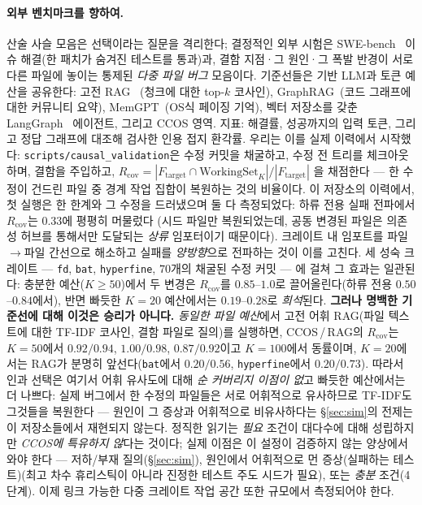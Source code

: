 \documentclass[11pt]{article}
\newcommand{\code}[1]{\texttt{#1}}
\begin{document}
\paragraph{외부 벤치마크를 향하여.} 산술 사슬 모음은 선택이라는 질문을 격리한다; 결정적인 외부 시험은
SWE-bench~\cite{jimenez2023swebench} 이슈 해결(한 패치가 숨겨진 테스트를 통과)과, 결함 지점·그 원인·그 폭발 반경이
서로 다른 파일에 놓이는 통제된 \emph{다중 파일 버그} 모음이다. 기준선들은 기반 LLM과 토큰 예산을 공유한다: 고전 RAG
~\cite{lewis2020rag}(청크에 대한 top-$k$ 코사인), GraphRAG~\cite{edge2024graphrag}(코드 그래프에 대한 커뮤니티
요약), MemGPT~\cite{packer2023memgpt}(OS식 페이징 기억), 벡터 저장소를 갖춘 LangGraph~\cite{langgraph} 에이전트,
그리고 CCOS 영역. 지표: 해결률, 성공까지의 입력 토큰, 그리고 정답 그래프에 대조해 검사한 인용 접지 환각률. 우리는 이를
실제 이력에서 시작했다: \code{scripts/causal\_validation}은 수정 커밋을 채굴하고, 수정 전 트리를 체크아웃하며, 결함을
주입하고,
$R_{\mathrm{cov}} = |F_{\mathrm{target}} \cap \mathrm{WorkingSet}_K| / |F_{\mathrm{target}}|$
을 채점한다 --- 한 수정이 건드린 파일 중 경계 작업 집합이 복원하는 것의 비율이다. 이 저장소의 이력에서, 첫 실행은 한
한계와 그 수정을 드러냈으며 둘 다 측정되었다: 하류 전용 실패 전파에서 $R_{\mathrm{cov}}$는 $0.33$에 평평히 머물렀다
(시드 파일만 복원되었는데, 공동 변경된 파일은 의존성 허브를 통해서만 도달되는 \emph{상류} 임포터이기 때문이다).
크레이트 내 임포트를 파일$\to$파일 간선으로 해소하고 실패를 \emph{양방향}으로 전파하는 것이 이를 고친다. 세 성숙
크레이트 --- \code{fd}, \code{bat}, \code{hyperfine}, $70$개의 채굴된 수정 커밋 --- 에 걸쳐 그 효과는 일관된다:
충분한 예산($K{\ge}50$)에서 두 변경은 $R_{\mathrm{cov}}$를 $0.85$--$1.0$로 끌어올린다(하류 전용 $0.50$--$0.84$에서),
반면 빠듯한 $K{=}20$ 예산에서는 $0.19$--$0.28$로 \emph{희석}된다. \textbf{그러나 명백한 기준선에 대해 이것은 승리가
아니다.} \emph{동일한 파일 예산}에서 고전 어휘 RAG(파일 텍스트에 대한 TF-IDF 코사인, 결함 파일로 질의)를 실행하면,
CCOS\,/\,RAG의 $R_{\mathrm{cov}}$는 $K{=}50$에서 $0.92/0.94$, $1.00/0.98$, $0.87/0.92$이고 $K{=}100$에서 동률이며,
$K{=}20$에서는 RAG가 분명히 앞선다(\code{bat}에서 $0.20/0.56$, \code{hyperfine}에서 $0.20/0.73$). 따라서 인과 선택은
여기서 어휘 유사도에 대해 \emph{순 커버리지 이점이 없}고 빠듯한 예산에서는 더 나쁘다: 실제 버그에서 한 수정의 파일들은
서로 어휘적으로 유사하므로 TF-IDF도 그것들을 복원한다 --- 원인이 그 증상과 어휘적으로 비유사하다는 \S\ref{sec:sim}의
전제는 이 저장소들에서 재현되지 않는다. 정직한 읽기는 \emph{필요} 조건이 대다수에 대해 성립하지만 \emph{CCOS에
특유하지 않}다는 것이다; 실제 이점은 이 설정이 검증하지 않는 양상에서 와야 한다 --- 저하/부재 질의(\S\ref{sec:sim}),
원인에서 어휘적으로 먼 증상(실패하는 테스트)(최고 차수 휴리스틱이 아니라 진정한 테스트 주도 시드가 필요), 또는
\emph{충분} 조건(4단계). 이제 링크 가능한 다중 크레이트 작업 공간 또한 규모에서 측정되어야 한다.
\end{document}
